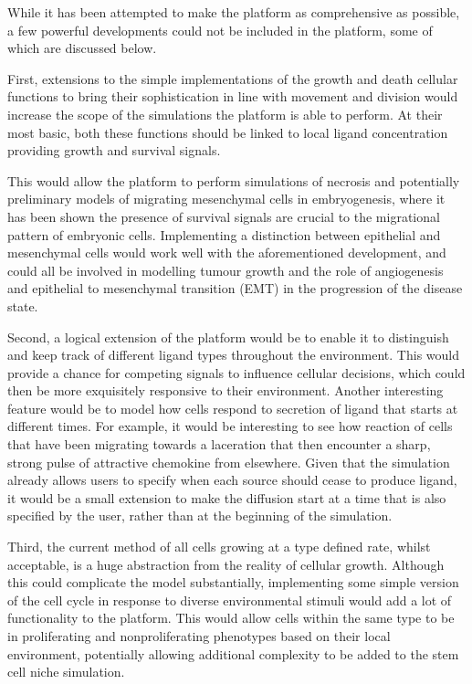 \documentclass[12pt]{article}
\begin{document}
While it has been attempted to make the platform as comprehensive as 
possible, a few powerful developments could not be included in the 
platform, some of which are discussed below. 

First, extensions to the simple implementations of the growth and death 
cellular functions to bring their sophistication in line with movement 
and division would increase the scope of the simulations the platform is 
able to perform. At their most basic, both these functions should be 
linked to local ligand concentration providing growth and survival 
signals. 

This would allow the platform to perform simulations of necrosis and 
potentially preliminary models of migrating mesenchymal cells in 
embryogenesis, where it has been shown the presence of survival signals 
are crucial to the migrational pattern of embryonic cells.\cite{raz09} Implementing 
a distinction between epithelial and mesenchymal cells would work well 
with the aforementioned development, and could all be involved in 
modelling tumour growth and the role of angiogenesis and epithelial to 
mesenchymal transition (EMT) in the progression of the disease state.

Second, a logical extension of the platform would be to enable it to 
distinguish and keep track of different ligand types throughout the 
environment. This would provide a chance for competing signals to 
influence cellular decisions, which could then be more exquisitely 
responsive to their environment. Another interesting feature would be to 
model how cells respond to secretion of ligand that starts at different 
times. For example, it would be interesting to see how reaction of cells 
that have been migrating towards a laceration that then encounter a 
sharp, strong pulse of attractive chemokine from elsewhere. Given that 
the simulation already allows users to specify when each source should 
cease to produce ligand, it would be a small extension to make the 
diffusion start at a time that is also specified by the user, rather 
than at the beginning of the simulation. 

Third, the current method of all cells growing at a type defined rate, 
whilst acceptable, is a huge abstraction from the reality of cellular 
growth. Although this could complicate the model substantially, 
implementing some simple version of the cell cycle in response to 
diverse environmental stimuli would add a lot of functionality to the 
platform. This would allow cells within the same type to be in 
proliferating and nonproliferating phenotypes based on their local 
environment, potentially allowing additional complexity to be added to 
the stem cell niche simulation.
\end{document}
